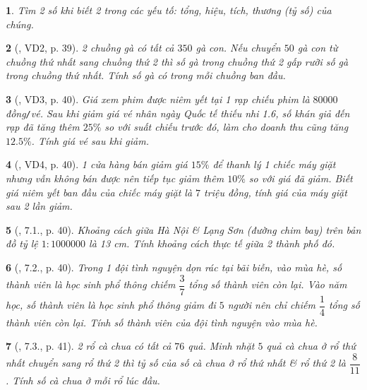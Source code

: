 \documentclass{article}
\newtheorem{baitoan}{}
\begin{document}
\begin{baitoan}
	Tìm 2 số khi biết 2 trong các yếu tố: tổng, hiệu, tích, thương (tỷ số) của chúng.
\end{baitoan}

\begin{baitoan}[\cite{Binh_boi_duong_Toan_6_tap_2}, VD2, p. 39]
	2 chuồng gà có tất cả $350$ gà con. Nếu chuyển $50$ gà con từ chuồng thứ nhất sang chuồng thứ 2 thì số gà trong chuồng thứ 2 gấp rưỡi số gà trong chuồng thứ nhất. Tính số gà có trong mỗi chuồng ban đầu.
\end{baitoan}

\begin{baitoan}[\cite{Binh_boi_duong_Toan_6_tap_2}, VD3, p. 40]
	Giá xem phim được niêm yết tại 1 rạp chiếu phim là $80000$ đồng{\tt/}vé. Sau khi giảm giá vé nhân ngày Quốc tế thiếu nhi 1.6, số khán giả đến rạp đã tăng thêm $25\%$ so với suất chiếu trước đó, làm cho doanh thu cũng tăng $12.5\%$. Tính giá vé sau khi giảm.
\end{baitoan}

\begin{baitoan}[\cite{Binh_boi_duong_Toan_6_tap_2}, VD4, p. 40]
	1 cửa hàng bán giảm giá $15\%$ để thanh lý 1 chiếc máy giặt nhưng vẫn không bán được nên tiếp tục giảm thêm $10\%$ so với giá đã giảm. Biết giá niêm yết ban đầu của chiếc máy giặt là $7$ triệu đồng, tính giá của máy giặt sau 2 lần giảm.
\end{baitoan}

\begin{baitoan}[\cite{Binh_boi_duong_Toan_6_tap_2}, 7.1., p. 40]
	Khoảng cách giữa Hà Nội \& Lạng Sơn (đường chim bay) trên bản đồ tỷ lệ $1:1000000$ là {\rm13 cm}. Tính khoảng cách thực tế giữa 2 thành phố đó.
\end{baitoan}

\begin{baitoan}[\cite{Binh_boi_duong_Toan_6_tap_2}, 7.2., p. 40]
	Trong 1 đội tình nguyện dọn rác tại bãi biễn, vào mùa hè, số thành viên là học sinh phổ thông chiếm $\dfrac{3}{7}$ tổng số thành viên còn lại. Vào năm học, số thành viên là học sinh phổ thông giảm đi $5$ người nên chỉ chiếm $\dfrac{1}{4}$ tổng số thành viên còn lại. Tính số thành viên của đội tình nguyện vào mùa hè.
\end{baitoan}

\begin{baitoan}[\cite{Binh_boi_duong_Toan_6_tap_2}, 7.3., p. 41]
	2 rổ cà chua có tất cả $76$ quả. Minh nhặt $5$ quả cà chua ở rổ thứ nhất chuyển sang rổ thứ 2 thì tỷ số của số cà chua ở rổ thứ nhất \& rổ thứ 2 là $\dfrac{8}{11}$. Tính số cà chua ở mỗi rổ lúc đầu.
\end{baitoan}
\end{document}
